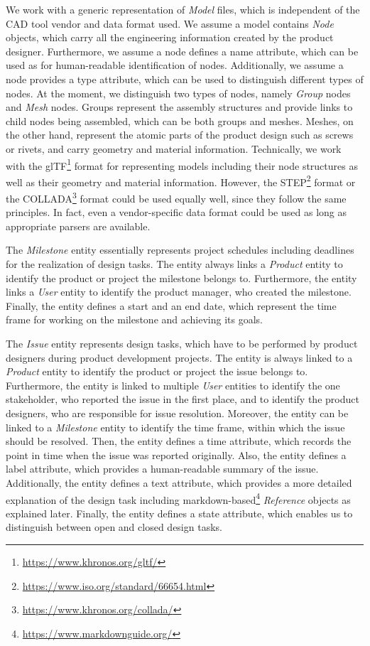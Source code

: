 We work with a generic representation of \textit{Model} files, which is independent of the CAD tool vendor and data format used.
We assume a model contains \textit{Node} objects, which carry all the engineering information created by the product designer.
Furthermore, we assume a node defines a name attribute, which can be used as for human-readable identification of nodes.
Additionally, we assume a node provides a type attribute, which can be used to distinguish different types of nodes.
At the moment, we distinguish two types of nodes, namely \textit{Group} nodes and \textit{Mesh} nodes.
Groups represent the assembly structures and provide links to child nodes being assembled, which can be both groups and meshes.
Meshes, on the other hand, represent the atomic parts of the product design such as screws or rivets, and carry geometry and material information.
Technically, we work with the glTF\footnote{\url{https://www.khronos.org/gltf/}} format for representing models including their node structures as well as their geometry and material information.
However, the STEP\footnote{\url{https://www.iso.org/standard/66654.html}} format or the COLLADA\footnote{\url{https://www.khronos.org/collada/}} format could be used equally well, since they follow the same principles.
In fact, even a vendor-specific data format could be used as long as appropriate parsers are available.

The \textit{Milestone} entity essentially represents project schedules including deadlines for the realization of design tasks.
The entity always links a \textit{Product} entity to identify the product or project the milestone belongs to.
Furthermore, the entity links a \textit{User} entity to identify the product manager, who created the milestone.
Finally, the entity defines a start and an end date, which represent the time frame for working on the milestone and achieving its goals.

The \textit{Issue} entity represents design tasks, which have to be performed by product designers during product development projects.
The entity is always linked to a \textit{Product} entity to identify the product or project the issue belongs to.
Furthermore, the entity is linked to multiple \textit{User} entities to identify the one stakeholder, who reported the issue in the first place, and to identify the product designers, who are responsible for issue resolution.
Moreover, the entity can be linked to a \textit{Milestone} entity to identify the time frame, within which the issue should be resolved.
Then, the entity defines a time attribute, which records the point in time when the issue was reported originally.
Also, the entity defines a label attribute, which provides a human-readable summary of the issue.
Additionally, the entity defines a text attribute, which provides a more detailed explanation of the design task including markdown-based\footnote{\url{https://www.markdownguide.org/}} \textit{Reference} objects as explained later.
Finally, the entity defines a state attribute, which enables us to distinguish between open and closed design tasks.

